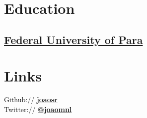 \documentclass[]{willianpaixao-resume}
\begin{document}
\lastupdated



\begin{minipage}[t]{0.35\textwidth} 


\section{Education}

\subsection{\href{http://www.portal.ufpa.br/}{Federal University of Para}}
\sectionsep


\section{Links} 
Github:// \href{https://github.com/joaosr}{\bf joaosr} \\
Twitter://  \href{https://twitter.com/joao_mnl}{\bf @joao\underline{\hspace{.10in}}mnl}\\
\sectionsep


\end{minipage}
\end{document}
